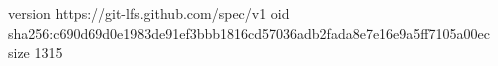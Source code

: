 version https://git-lfs.github.com/spec/v1
oid sha256:c690d69d0e1983de91ef3bbb1816cd57036adb2fada8e7e16e9a5ff7105a00ec
size 1315
